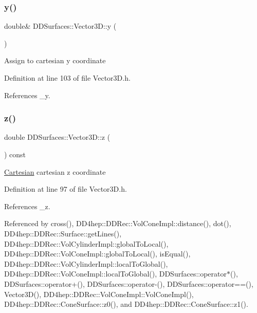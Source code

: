 \hypertarget{class_d_d_surfaces_1_1_vector3_d_a0ff1549e1a9f987f22f84bc4e86605db}{}\label{class_d_d_surfaces_1_1_vector3_d_a0ff1549e1a9f987f22f84bc4e86605db} 
\subsubsection{\texorpdfstring{y()}{y()}\hspace{0.1cm}{\footnotesize\ttfamily [2/2]}}
{\footnotesize\ttfamily double\& D\+D\+Surfaces\+::\+Vector3\+D\+::y (\begin{DoxyParamCaption}{ }\end{DoxyParamCaption})\hspace{0.3cm}{\ttfamily [inline]}}

Assign to cartesian y coordinate 

Definition at line 103 of file Vector3\+D.\+h.



References \+\_\+y.

\hypertarget{class_d_d_surfaces_1_1_vector3_d_a12806622b73dbf8875b9a18f9c4bf45f}{}\label{class_d_d_surfaces_1_1_vector3_d_a12806622b73dbf8875b9a18f9c4bf45f} 
\subsubsection{\texorpdfstring{z()}{z()}\hspace{0.1cm}{\footnotesize\ttfamily [1/2]}}
{\footnotesize\ttfamily double D\+D\+Surfaces\+::\+Vector3\+D\+::z (\begin{DoxyParamCaption}{ }\end{DoxyParamCaption}) const\hspace{0.3cm}{\ttfamily [inline]}}

\hyperlink{struct_d_d_surfaces_1_1_vector3_d_1_1_cartesian}{Cartesian} cartesian z coordinate 

Definition at line 97 of file Vector3\+D.\+h.



References \+\_\+z.



Referenced by cross(), D\+D4hep\+::\+D\+D\+Rec\+::\+Vol\+Cone\+Impl\+::distance(), dot(), D\+D4hep\+::\+D\+D\+Rec\+::\+Surface\+::get\+Lines(), D\+D4hep\+::\+D\+D\+Rec\+::\+Vol\+Cylinder\+Impl\+::global\+To\+Local(), D\+D4hep\+::\+D\+D\+Rec\+::\+Vol\+Cone\+Impl\+::global\+To\+Local(), is\+Equal(), D\+D4hep\+::\+D\+D\+Rec\+::\+Vol\+Cylinder\+Impl\+::local\+To\+Global(), D\+D4hep\+::\+D\+D\+Rec\+::\+Vol\+Cone\+Impl\+::local\+To\+Global(), D\+D\+Surfaces\+::operator$\ast$(), D\+D\+Surfaces\+::operator+(), D\+D\+Surfaces\+::operator-\/(), D\+D\+Surfaces\+::operator==(), Vector3\+D(), D\+D4hep\+::\+D\+D\+Rec\+::\+Vol\+Cone\+Impl\+::\+Vol\+Cone\+Impl(), D\+D4hep\+::\+D\+D\+Rec\+::\+Cone\+Surface\+::z0(), and D\+D4hep\+::\+D\+D\+Rec\+::\+Cone\+Surface\+::z1().

